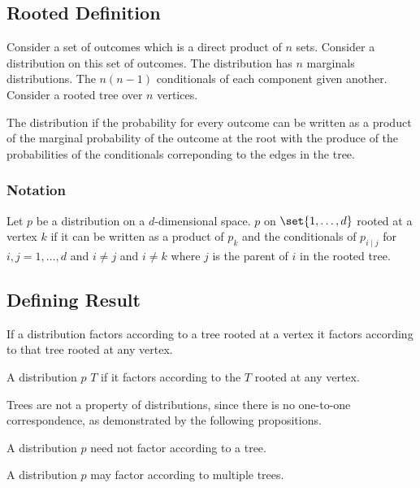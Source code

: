 


\subsection{Rooted Definition}

Consider a set of outcomes which
is a direct product of $n$ sets.
Consider a distribution on this
set of outcomes.
The distribution has
$n$ marginals distributions.
The $n(n-1)$ conditionals
of each component given another.
Consider a rooted tree over $n$ vertices.

The distribution
if the probability for every outcome can
be written as a product
of the marginal probability of the outcome
at the root with the produce of the probabilities
of the conditionals correponding to the edges
in the tree.

\subsubsection{Notation}


Let $p$ be a distribution on
a $d$-dimensional space.
$p$
on $\set{1, \dots, d}$ rooted
at a vertex $k$ if it can be
written as a product of $p_k$
and the conditionals of $p_{i \mid j}$
for $i,j = 1, \dots, d$ and $i \neq j$
and $i \neq k$ where $j$ is the parent
of $i$ in the rooted tree.

\subsection{Defining Result}
\begin{prop}
If a distribution factors according
to a tree rooted at a vertex it
factors according to that tree rooted
at any vertex.
\end{prop}


A distribution $p$
 $T$
if it factors according to the
$T$ rooted at any vertex.


Trees are not a property of distributions,
since there is no one-to-one correspondence,
as demonstrated by the following propositions.


A distribution $p$ need not factor according to a tree.

A distribution
$p$ may factor according to multiple trees.
